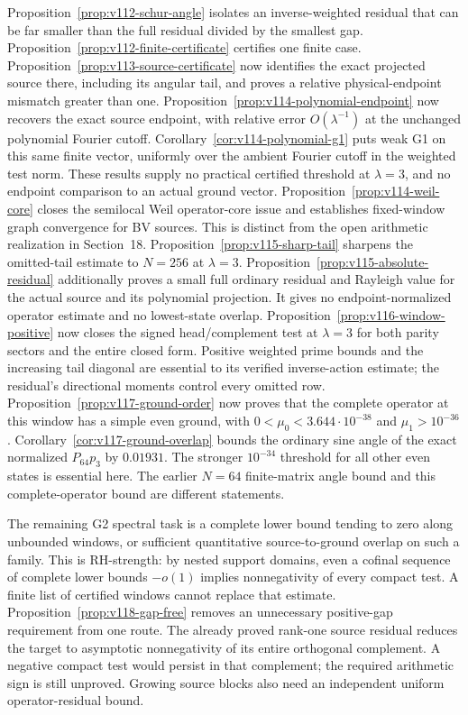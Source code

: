 \documentclass[11pt]{article}
\theoremstyle{remark}
\begin{document}
Proposition~\ref{prop:v112-schur-angle} isolates an inverse-weighted
residual that can be far smaller than the full residual divided by the
smallest gap. Proposition~\ref{prop:v112-finite-certificate} certifies
one finite case. Proposition~\ref{prop:v113-source-certificate} now
identifies the exact projected source there, including its angular tail,
and proves a relative physical-endpoint mismatch greater than one.
Proposition~\ref{prop:v114-polynomial-endpoint} now recovers the exact
source endpoint, with relative error $O(\lambda^{-1})$ at the unchanged
polynomial Fourier cutoff. Corollary~\ref{cor:v114-polynomial-g1}
puts weak G1 on this same finite vector, uniformly over the ambient
Fourier cutoff in the weighted test norm. These results supply no
practical certified threshold
at $\lambda=3$, and no endpoint comparison to an actual ground vector.
Proposition~\ref{prop:v114-weil-core} closes the semilocal Weil
operator-core issue and establishes fixed-window graph convergence for
BV sources. This is distinct from the open arithmetic realization in
Section~18. Proposition~\ref{prop:v115-sharp-tail} sharpens the omitted-tail
estimate to $N=256$ at $\lambda=3$. Proposition~\ref{prop:v115-absolute-residual}
additionally proves a small full ordinary residual and Rayleigh value
for the actual source and its polynomial projection. It gives no
endpoint-normalized operator estimate and no lowest-state overlap.
Proposition~\ref{prop:v116-window-positive} now closes the signed
head/complement test at $\lambda=3$ for both parity sectors and the
entire closed form. Positive weighted prime bounds and the increasing
tail diagonal are essential to its verified inverse-action estimate;
the residual's directional moments control every omitted row.
Proposition~\ref{prop:v117-ground-order} now proves that the complete
operator at this window has a simple even ground, with
$0<\mu_0<3.644\cdot10^{-38}$ and $\mu_1>10^{-36}$.
Corollary~\ref{cor:v117-ground-overlap} bounds the ordinary sine angle
of the exact normalized $P_{64}p_3$ by $0.01931$. The stronger
$10^{-34}$ threshold for all other even states is essential here.
The earlier $N=64$ finite-matrix angle bound and this complete-operator
bound are different statements.

The remaining G2 spectral task is a complete lower bound tending to
zero along unbounded windows, or sufficient quantitative source-to-ground
overlap on such a family. This is RH-strength: by nested support domains,
even a cofinal sequence of complete lower bounds $-o(1)$ implies
nonnegativity of every compact test. A finite list of certified windows
cannot replace that estimate.
Proposition~\ref{prop:v118-gap-free} removes an unnecessary positive-gap
requirement from one route. The already proved rank-one source residual
reduces the target to asymptotic nonnegativity of its entire orthogonal
complement. A negative compact test would persist in that complement;
the required arithmetic sign is still unproved. Growing source blocks
also need an independent uniform operator-residual bound.
\end{document}

